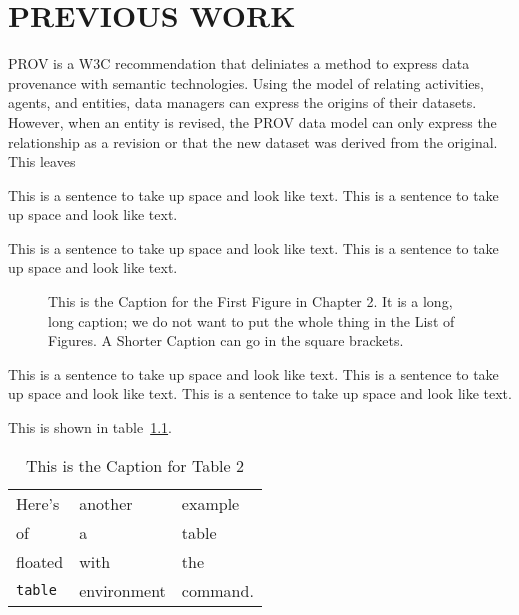 
\chapter{PREVIOUS WORK}
PROV is a W3C recommendation that deliniates a method to express data provenance with semantic technologies.  Using the model of relating activities, agents, and entities, data managers can express the origins of their datasets.  However, when an entity is revised, the PROV data model can only express the relationship as a revision or that the new dataset was derived from the original.  This leaves

This is a sentence to take up space and look like text.
This is a sentence to take up space and look like text.

This is a sentence to take up space and look like text.
This is a sentence to take up space and look like text.

\begin{figure}
\centering
\vspace{2.0in}
\caption[A Shorter Caption for the List of Figures]
   {This is the Caption for the First Figure in Chapter 2.  It is a
    long, long caption; we do not want to put the whole thing in the
    List of Figures. A Shorter Caption can go in the square brackets.}
\end{figure}

This is a sentence to take up space and look like text.
This is a sentence to take up space and look like text.
This is a sentence to take up space and look like text.

This is shown in table~\ref{mytable}.  %

\begin{table}
\caption{This is the Caption for Table 2}
\label{mytable}        %
\begin{center}
\begin{tabular}{lll}
Here's       & another     & example  \\
of           & a           & table    \\
floated      & with        & the      \\
\verb+table+ & environment & command.
\end{tabular}
\end{center}
\end{table}

